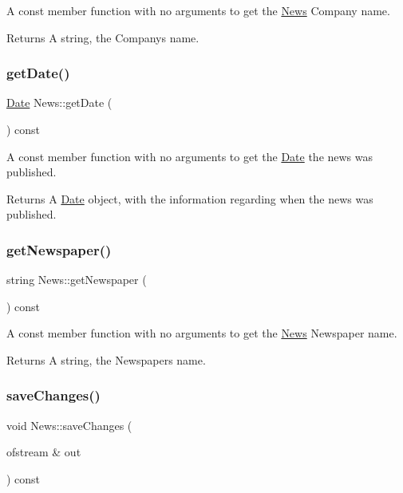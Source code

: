 A const member function with no arguments to get the \hyperlink{class_news}{News}\textquotesingle{} Company name. \begin{DoxyReturn}{Returns}
A string, the Company\textquotesingle{}s name. 
\end{DoxyReturn}
\hypertarget{class_news_ac0970d5b32fede42e29a3b326113cda0}{}\label{class_news_ac0970d5b32fede42e29a3b326113cda0} 
\subsubsection{\texorpdfstring{get\+Date()}{getDate()}}
{\footnotesize\ttfamily \hyperlink{class_date}{Date} News\+::get\+Date (\begin{DoxyParamCaption}{ }\end{DoxyParamCaption}) const}

A const member function with no arguments to get the \hyperlink{class_date}{Date} the news was published. \begin{DoxyReturn}{Returns}
A \hyperlink{class_date}{Date} object, with the information regarding when the news was published. 
\end{DoxyReturn}
\hypertarget{class_news_af94abb955ce219bce13bb3169df25826}{}\label{class_news_af94abb955ce219bce13bb3169df25826} 
\subsubsection{\texorpdfstring{get\+Newspaper()}{getNewspaper()}}
{\footnotesize\ttfamily string News\+::get\+Newspaper (\begin{DoxyParamCaption}{ }\end{DoxyParamCaption}) const}

A const member function with no arguments to get the \hyperlink{class_news}{News}\textquotesingle{} Newspaper name. \begin{DoxyReturn}{Returns}
A string, the Newspaper\textquotesingle{}s name. 
\end{DoxyReturn}
\hypertarget{class_news_a138d8508a5b0f9e42ea7e1b45e109a64}{}\label{class_news_a138d8508a5b0f9e42ea7e1b45e109a64} 
\subsubsection{\texorpdfstring{save\+Changes()}{saveChanges()}}
{\footnotesize\ttfamily void News\+::save\+Changes (\begin{DoxyParamCaption}\item[{ofstream \&}]{out }\end{DoxyParamCaption}) const}

